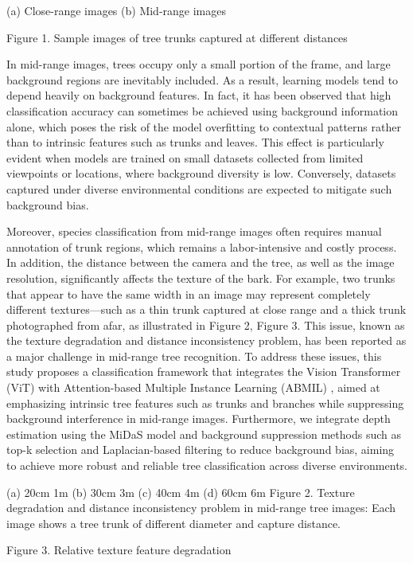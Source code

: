 \documentclass{article}
\begin{document}
(a) Close-range images	(b) Mid-range images

Figure 1. Sample images of tree trunks captured at different distances

In mid-range images, trees occupy only a small portion of the frame, and large background regions are inevitably included. As a result, learning models tend to depend heavily on background features. In fact, it has been observed that high classification accuracy can sometimes be achieved using background information alone, which poses the risk of the model overfitting to contextual patterns rather than to intrinsic features such as trunks and leaves. This effect is particularly evident when models are trained on small datasets collected from limited viewpoints or locations, where background diversity is low. Conversely, datasets captured under diverse environmental conditions are expected to mitigate such background bias.

Moreover, species classification from mid-range images often requires manual annotation of trunk regions, which remains a labor-intensive and costly process. In addition, the distance between the camera and the tree, as well as the image resolution, significantly affects the texture of the bark. For example, two trunks that appear to have the same width in an image may represent completely different textures—such as a thin trunk captured at close range and a thick trunk photographed from afar, as illustrated in Figure 2, Figure 3. This issue, known as the texture degradation and distance inconsistency problem, has been reported as a major challenge in mid-range tree recognition.
To address these issues, this study proposes a classification framework that integrates the Vision Transformer (ViT) \cite{ref1} with Attention-based Multiple Instance Learning (ABMIL) \cite{ref2}, aimed at emphasizing intrinsic tree features such as trunks and branches while suppressing background interference in mid-range images. Furthermore, we integrate depth estimation using the MiDaS \cite{ref3} model and background suppression methods such as top-k selection and Laplacian-based filtering to reduce background bias, aiming to achieve more robust and reliable tree classification across diverse environments.

(a)  20cm 1m	(b) 30cm 3m	(c) 40cm 4m	(d) 60cm 6m
Figure 2. Texture degradation and distance inconsistency problem in mid-range tree images:
Each image shows a tree trunk of different diameter and capture distance.

Figure 3. Relative texture feature degradation
\end{document}
